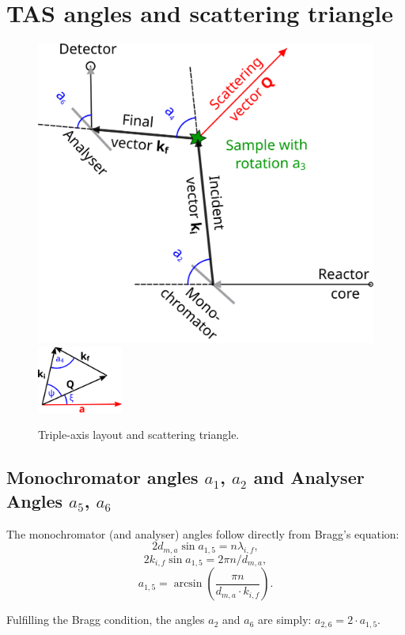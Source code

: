 \section{TAS angles and scattering triangle}
\begin{figure}
\begin{center}
	\includegraphics[width = 0.5 \textwidth]{figures/tas}
	\hspace{1.5cm}
	\includegraphics[trim=0 -2cm 0 0, width=0.25\textwidth]{figures/triangle}
\end{center}
\caption{Triple-axis layout and scattering triangle.}
\end{figure}


\subsection*{Monochromator angles $a_1$, $a_2$ and Analyser Angles $a_5$, $a_6$}

The monochromator (and analyser) angles follow directly from Bragg's equation:
\begin{equation} 2 d_{m,a}\sin a_{1,5} = n \lambda_{i,f}, \end{equation}
\begin{equation} 2 k_{i,f} \sin a_{1,5} = 2 \pi n / d_{m,a}, \end{equation}
\begin{equation} \boxed{ a_{1,5} = \arcsin \left( \frac{\pi n}{d_{m,a} \cdot k_{i,f}} \right). } \end{equation}

Fulfilling the Bragg condition, the angles $a_2$ and $a_6$ are simply: $a_{2,6} = 2 \cdot a_{1,5}.$



